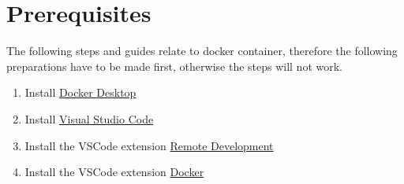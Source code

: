 
\chapter{Prerequisites}
    The following steps and guides relate to docker container, therefore the following preparations have to be made first, otherwise the steps will not work.  

    \begin{enumerate}
        \item Install \href{https://www.docker.com/products/docker-desktop/}{Docker Desktop}
        \item Install \href{https://code.visualstudio.com/download}{Visual Studio Code} 
        \item Install the VSCode extension \href{https://marketplace.visualstudio.com/items?itemName=ms-vscode-remote.vscode-remote-extensionpack}{Remote Development} 
        \item Install the VSCode extension \href{https://marketplace.visualstudio.com/items?itemName=ms-azuretools.vscode-docker}{Docker}
    \end{enumerate}    


